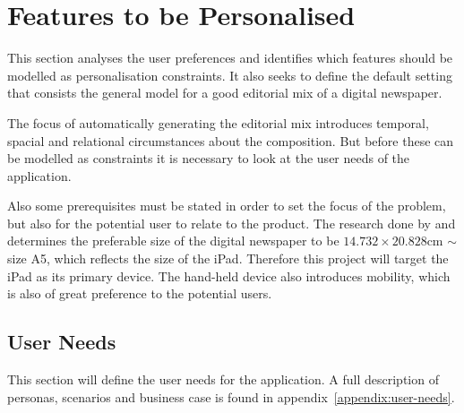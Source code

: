 \chapter{Features to be Personalised} %
\label{ch:analysis}
This section analyses the user preferences and identifies which features should be modelled as personalisation constraints. It also seeks to define the default setting that consists the general model for a good editorial mix of a digital newspaper.

The focus of automatically generating the editorial mix introduces temporal, spacial and relational circumstances about the composition. But before these can be modelled as constraints it is necessary to look at the user needs of the application.
%

Also some prerequisites must be stated in order to set the focus of the problem, but also for the potential user to relate to the product. The research done by \cite{FULLTEXT01.pdf} and \cite{kristin_fredrik.pdf} determines the preferable size of the digital newspaper to be $14.732 \times 20.828$cm $\sim$ size A5, which reflects the size of the iPad. Therefore this project will target the iPad as its primary device. The hand-held device also introduces mobility, which is also of great preference to the potential users.
%

\section{User Needs}
This section will define the user needs for the application. A full description of personas, scenarios and business case is found in appendix~\vref{appendix:user-needs}.

